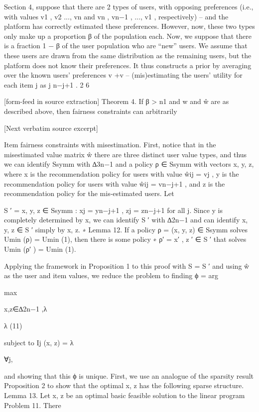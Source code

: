 \documentclass[10pt]{article}
\begin{document}
\begin{ReviewVerbatim}
Section 4, suppose that there are 2 types of users, with opposing preferences (i.e., with values
v1 , v2 ..., vn and vn , vn−1 , ..., v1 , respectively) – and the platform has correctly estimated these
preferences. However, now, these two types only make up a proportion β of the population each.
Now, we suppose that there is a fraction 1 − β of the user population who are “new” users. We assume
that these users are drawn from the same distribution as the remaining users, but the platform does
not know their preferences. It thus constructs a prior by averaging over the known users’ preferences
v +v
– (mis)estimating the users’ utility for each item j as j n−j+1
.
2
6


[form-feed in source extraction]
Theorem 4. If β > n1 and w and ŵ are as described above, then fairness constraints can arbitrarily

[Next verbatim source excerpt]

Item fairness constraints with misestimation. First, notice that in the misestimated value matrix
ŵ there are three distinct user value types, and thus we can identify Ssymm with ∆3n−1 and a policy
ρ ∈ Ssymm with vectors x, y, z, where x is the recommendation policy for users with value ŵij = vj ,
y is the recommendation policy for users with value ŵij = vn−j+1 , and z is the recommendation
policy for the mis-estimated users.
Let

S ′ = {x, y, z ∈ Ssymm : xj = yn−j+1 , zj = zn−j+1 for all j}.
Since y is completely determined by x, we can identify S ′ with ∆2n−1 and can identify x, y, z ∈ S ′
simply by x, z.
∗
Lemma 12. If a policy ρ = (x, y, z) ∈ Ssymm solves Umin (ρ) = Umin
(1), then there is some policy
∗
ρ′ = x′ , z ′ ∈ S ′ that solves Umin (ρ′ ) = Umin
(1).

Applying the framework in Proposition 1 to this proof with S = S ′ and using ŵ as the user and item
values, we reduce the problem to finding
ϕ = arg

max

x,z∈∆2n−1 ,λ

λ
(11)

subject to Ij (x, z) = λ

∀j,

and showing that this ϕ is unique.
First, we use an analogue of the sparsity result Proposition 2 to show that the optimal x, z has the
following sparse structure.
Lemma 13. Let x, z be an optimal basic feasible solution to the linear program Problem 11. There


\end{ReviewVerbatim}
\end{document}

